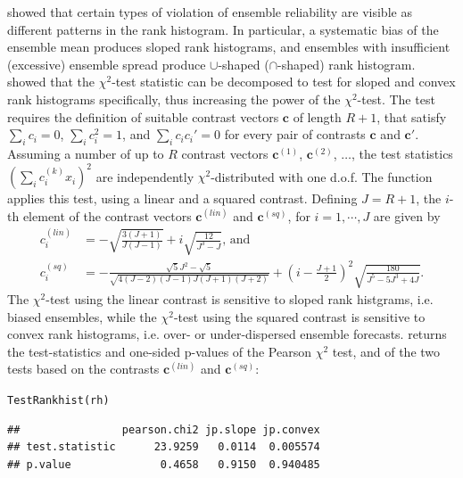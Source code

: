 \documentclass[article]{jss}\usepackage[]{graphicx}\usepackage[]{color}
\makeatletter
\newcommand{\hlstd}[1]{\textcolor[rgb]{0,0,0}{#1}}%
\newcommand{\hlkwd}[1]{\textcolor[rgb]{0,0.267,0.4}{#1}}%
\newenvironment{kframe}{%
 \def\at@end@of@kframe{}%
 \ifinner\ifhmode%
  \def\at@end@of@kframe{\end{minipage}}%
  \begin{minipage}{\columnwidth}%
 \fi\fi%
 \def\FrameCommand##1{\hskip\@totalleftmargin \hskip-\fboxsep
 \colorbox{shadecolor}{##1}\hskip-\fboxsep
     \hskip-\linewidth \hskip-\@totalleftmargin \hskip\columnwidth}%
 \MakeFramed {\advance\hsize-\width
   \@totalleftmargin\z@ \linewidth\hsize
   \@setminipage}}%
 {\par\unskip\endMakeFramed%
 \at@end@of@kframe}
\newenvironment{knitrout}{}{} %
\makeatother
\begin{document}
\citet{hamill2001interpretation} showed that certain types of violation of ensemble reliability are visible as different patterns in the rank histogram.
In particular, a systematic bias of the ensemble mean produces sloped rank histograms, and ensembles with insufficient (excessive) ensemble spread produce $\cup$-shaped ($\cap$-shaped) rank histogram.
\citet{jolliffe2008evaluating} showed that the $\chi^2$-test statistic can be decomposed to test for sloped and convex rank histograms specifically, thus increasing the power of the $\chi^2$-test.
The test requires the definition of suitable contrast vectors $\mathbf{c}$ of length $R+1$, that satisfy $\sum_i c_i = 0$, $\sum_i c_i^2 = 1$, and $\sum_i c_i c_i' = 0$ for every pair of contrasts $\mathbf{c}$ and $\mathbf{c}'$.
Assuming a number of up to $R$ contrast vectors $\mathbf{c}^{(1)}$, $\mathbf{c}^{(2)}$, $\dots$, the test statistics $(\sum_i c^{(k)}_i x_i)^2$ are independently $\chi^2$-distributed with one d.o.f. 
The function  applies this test, using a linear and a squared contrast. 
Defining $J=R+1$, the $i$-th element of the contrast vectors $\mathbf{c}^{(lin)}$ and $\mathbf{c}^{(sq)}$, for $i=1,\cdots,J$ are given by
%
\begin{align}
c^{(lin)}_i & = -\sqrt{\frac{3(J+1)}{J (J-1)}} + i \sqrt{\frac{12}{J^3 - J}}\text{, and}\\
c^{(sq)}_i & =  - \frac{\sqrt{5}  J^2 - \sqrt{5}}{\sqrt{4(J - 2)  (J-1) J (J+1) (J+2)}}+ \left(i - \frac{J+1}{2}\right)^2   \sqrt{\frac{180}{ J^5 - 5 J^3 + 4 J}}.
\end{align}
%
The $\chi^2$-test using the linear contrast is sensitive to sloped rank histgrams, i.e. biased ensembles, while the $\chi^2$-test using the squared contrast is sensitive to convex rank histograms, i.e. over- or under-dispersed ensemble forecasts.
 returns the test-statistics and one-sided p-values of the Pearson $\chi^2$ test, and of the two tests based on the contrasts $\mathbf{c}^{(lin)}$ and $\mathbf{c}^{(sq)}$:

\begin{knitrout}
\color{fgcolor}\begin{kframe}
\begin{alltt}
\hlkwd{TestRankhist}\hlstd{(rh)}
\end{alltt}
\begin{verbatim}
##                pearson.chi2 jp.slope jp.convex
## test.statistic      23.9259   0.0114  0.005574
## p.value              0.4658   0.9150  0.940485
\end{verbatim}
\end{kframe}
\end{knitrout}
\end{document}
